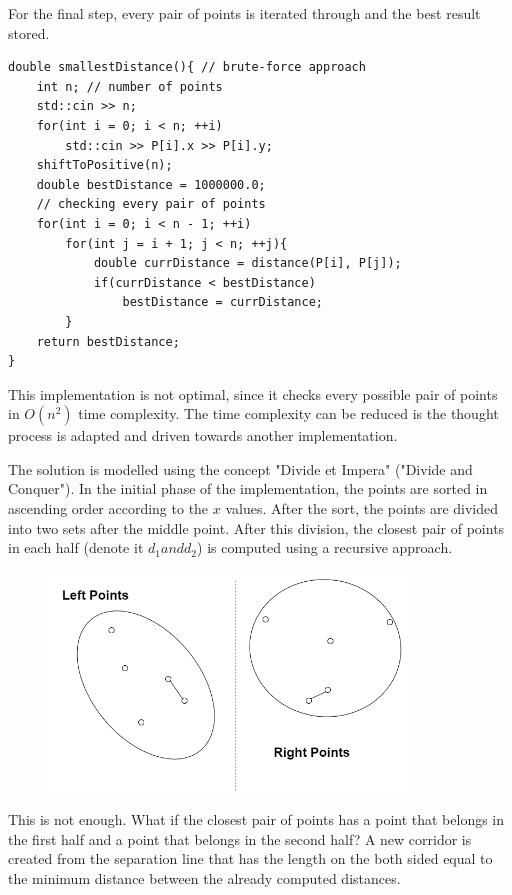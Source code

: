 \documentclass[letterpaper]{article}
\begin{document}
For the final step, every pair of points is iterated through and the best result stored.

\begin{lstlisting}
double smallestDistance(){ // brute-force approach
    int n; // number of points
    std::cin >> n;
    for(int i = 0; i < n; ++i)
        std::cin >> P[i].x >> P[i].y;
    shiftToPositive(n);
    double bestDistance = 1000000.0;
    // checking every pair of points
    for(int i = 0; i < n - 1; ++i)
        for(int j = i + 1; j < n; ++j){
            double currDistance = distance(P[i], P[j]);
            if(currDistance < bestDistance)
                bestDistance = currDistance;
        }
    return bestDistance;
}
\end{lstlisting}

This implementation is not optimal, since it checks every possible pair of points in $O(n^2)$ time complexity. The time complexity can be reduced is the thought process is adapted and driven towards another implementation.

The solution is modelled using the concept "Divide et Impera" ("Divide and Conquer"). In the initial phase of the implementation, the points are sorted in ascending order according to the $x$ values. After the sort, the points are divided into two sets after the middle point. After this division, the closest pair of points in each half (denote it $d_1 and d_2$) is computed using a recursive approach.
 
\begin{figure} [h!]
\centering
\includegraphics[width=0.85\textwidth]{pngOfDiagrams/closestpair2.png}
\end{figure}

This is not enough. What if the closest pair of points has a point that belongs in the first half and a point that belongs in the second half? A new corridor is created from the separation line that has the length on the both sided equal to the minimum distance between the already computed distances.
\end{document}
